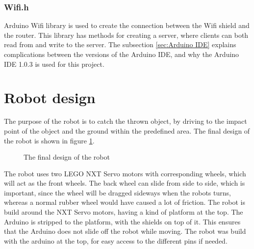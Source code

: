 \subsubsection{Wifi.h}
\label{sec:Wifi.h}
Arduino Wifi library is used to create the connection between the Wifi shield and the router. This library has methods for creating a server, where clients can both read from and write to the server. The subsection \ref{sec:Arduino IDE} explains complications between the versions of the Arduino IDE, and why the Arduino IDE 1.0.3 is used for this project.

\section{Robot design}
\label{sec:Robot design}
The purpose of the robot is to catch the thrown object, by driving to the impact point of the object and the ground within the predefined area. The final design of the robot is shown in figure \ref{robot}.

\begin{figure}[h]
	\centering
	\caption{The final design of the robot}
	\label{robot}
\end{figure}

The robot uses two LEGO NXT Servo motors with corresponding wheels, which will act as the front wheels. The back wheel can slide from side to side, which is important, since the wheel will be dragged sideways when the robots turns, whereas a normal rubber wheel would have caused a lot of friction. 
The robot is build around the NXT Servo motors, having a kind of platform at the top. The Arduino is stripped to the platform, with the shields on top of it. This ensures that the Arduino does not slide off the robot while moving.
The robot was build with the arduino at the top, for easy access to the different pins if needed. 

